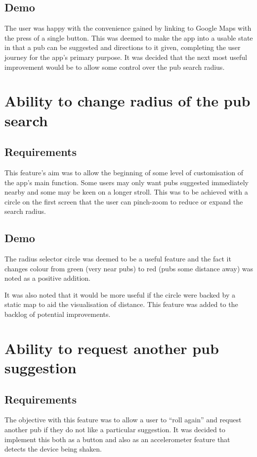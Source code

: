\documentclass{report}
\begin{document}
\subsection{Demo}

The user was happy with the convenience gained by linking to Google Maps
with the press of a single button. This was deemed to make the app into
a usable state in that a pub can be suggested and directions to it given,
completing the user journey for the app's primary purpose. It was decided
that the next most useful improvement would be to allow some control over
the pub search radius.

\section{Ability to change radius of the pub search}
\subsection{Requirements}

This feature's aim was to allow the beginning of some level of customisation
of the app's main function. Some users may only want pubs suggested
immediately nearby and some may be keen on a longer stroll. This was to be
achieved with a circle on the first screen that the user can pinch-zoom
to reduce or expand the search radius.

\subsection{Demo}

The radius selector circle was deemed to be a useful feature and the fact
it changes colour from green (very near pubs) to red (pubs some distance
away) was noted as a positive addition.

It was also noted that it would be more useful if the circle were backed
by a static map to aid the visualisation of distance. This feature was
added to the backlog of potential improvements.

\section{Ability to request another pub suggestion}
\subsection{Requirements}

The objective with this feature was to allow a user to ``roll again'' and
request another pub if they do not like a particular suggestion. It was
decided to implement this both as a button and also as an accelerometer
feature that detects the device being shaken.
\end{document}
